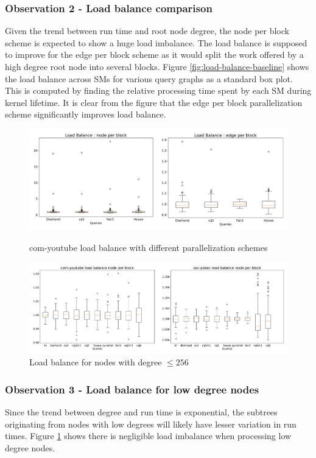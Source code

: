 \subsubsection*{Observation 2 - Load balance comparison}
Given the trend between run time and root node degree, the node per block scheme is expected to show a huge load imbalance.
The load balance is supposed to improve for the edge per block scheme as it would split the work offered by a high degree root node into several blocks.
Figure \ref{fig:load-balance-baseline} shows the load balance across SMs for various query graphs as a standard box plot.
This is computed by finding the relative processing time spent by each SM during kernel lifetime.
It is clear from the figure that the edge per block parallelization scheme significantly improves load balance.
\begin{figure}[t]
    \includegraphics[width=\textwidth]{fig/improvements/yt_lb-baseline_byedge.png}
    \caption{com-youtube load balance with different parallelization schemes}
    \label{fig:load-balance-baseline}

    \includegraphics[width=\textwidth]{fig/improvements/load-balance-LD.png}
    \caption{Load balance for nodes with degree $\leq 256$ }
    \label{fig:load-balance-LD}
\end{figure}

\subsubsection*{Observation 3 - Load balance for low degree nodes}
Since the trend between degree and run time is exponential, the subtrees originating from nodes with low degrees will likely have lesser variation in run times.
Figure \ref{fig:load-balance-LD} shows there is negligible load imbalance when processing low degree nodes.

